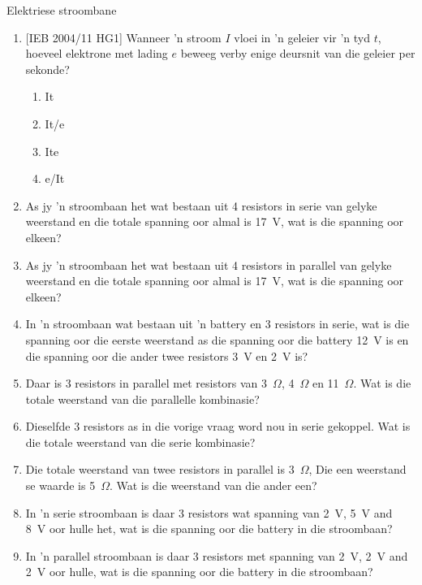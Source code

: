\begin{eocexercises}{Elektriese stroombane}
\begin{enumerate}[noitemsep, label=\textbf{\arabic*}. ]
{}

\item{[IEB 2004/11 HG1] Wanneer 'n stroom $I$ vloei in 'n geleier vir
 'n tyd $t$, hoeveel elektrone met lading $e$ beweeg verby enige deursnit van die
geleier per sekonde?
\begin{enumerate}[noitemsep, label=\textbf{\alph*}. ] 
\item{It}
\item{It/e}
\item{Ite}
\item{e/It}
\end{enumerate}}


\item As jy 'n stroombaan het wat bestaan uit 4 resistors in serie van gelyke weerstand en die totale spanning oor almal is 17~V, wat is die spanning oor elkeen?

\item As jy 'n stroombaan het wat bestaan uit 4 resistors in parallel van gelyke weerstand en die totale spanning oor almal is 17~V, wat is die spanning oor elkeen?

\item In 'n stroombaan wat bestaan uit 'n battery en 3 resistors in serie, wat is die spanning oor die eerste weerstand as die spanning oor die battery 12~V is en die spanning oor die ander twee resistors 3~V en 2~V is?

\item Daar is 3 resistors in parallel met resistors van 3~$\Omega$, 4~$\Omega$ en 11~$\Omega$.  Wat is die totale weerstand van die parallelle kombinasie?

\item Dieselfde 3 resistors as in die vorige vraag word nou in serie gekoppel. Wat is die totale weerstand van die serie kombinasie?

\item Die totale weerstand van twee resistors in parallel is 3~$\Omega$, Die een weerstand se waarde is 5~$\Omega$. Wat is die weerstand van die ander een?

\item In 'n serie stroombaan is daar 3 resistors wat spanning van 2~V, 5~V and 8~V oor hulle het, wat is die spanning oor die battery in die stroombaan?

\item In 'n parallel stroombaan is daar 3 resistors met spanning van 2~V, 2~V and 2~V oor hulle, wat is die spanning oor die battery in die stroombaan?




\end{enumerate}
\end{eocexercises}
